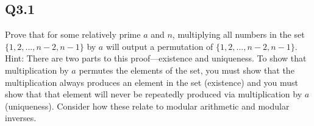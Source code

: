 \documentclass{article}
\begin{document}
\subsection*{Q3.1}
Prove that for some relatively prime $a$ and $n$, multiplying all numbers in the set $\{1,2,...,n-2,n-1\}$ by $a$ will output a permutation of $\{1,2,...,n-2,n-1\}$.
\\ Hint: There are two parts to this proof---existence and uniqueness. To show that multiplication by $a$ permutes the elements of the set, you must show that the multiplication always produces an element in the set (existence) and you must show that that element will never be repeatedly produced via multiplication by $a$ (uniqueness). Consider how these relate to modular arithmetic and modular inverses.
\newpage
\end{document}
